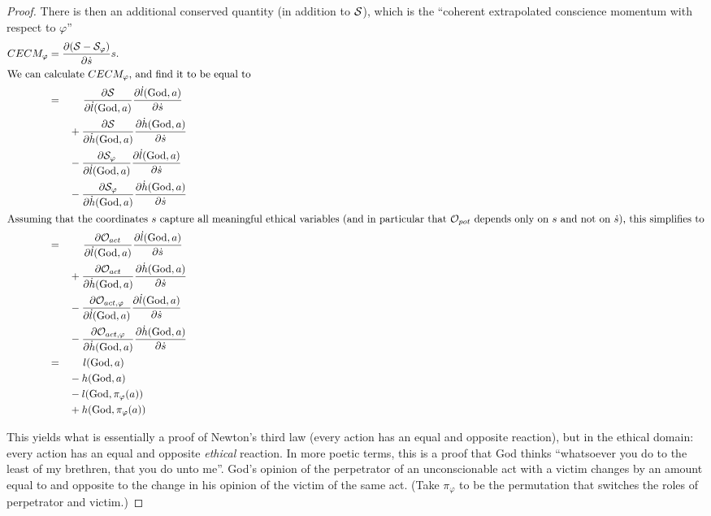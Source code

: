 \documentclass{article}
\begin{document}
\begin{proof}
  There is then an additional conserved quantity (in addition to
  ${\mathcal S}$), which is the ``coherent extrapolated conscience momentum
  with respect to $\varphi$''
  \begin{align*}
CECM_\varphi &= \frac{\partial ({\mathcal S} - {\mathcal S}_\varphi)}{\partial \dot{s}} s. \\
\intertext{We can calculate $CECM_\varphi$, and find it to be equal to}
&= \qquad \frac{\partial {\mathcal S}}{\partial \dot{l}(\mathrm{God}, a)} \frac{\partial \dot{l}(\mathrm{God}, a)}{\partial \dot{s}}\\
&\qquad + \frac{\partial {\mathcal S}}{\partial \dot{h}(\mathrm{God}, a)} \frac{\partial \dot{h}(\mathrm{God}, a)}{\partial \dot{s}}\\
&\qquad - \frac{\partial {\mathcal S}_\varphi}{\partial \dot{l}(\mathrm{God}, a)} \frac{\partial \dot{l}(\mathrm{God}, a)}{\partial \dot{s}}\\
&\qquad - \frac{\partial {\mathcal S}_\varphi}{\partial \dot{h}(\mathrm{God}, a)} \frac{\partial \dot{h}(\mathrm{God}, a)}{\partial \dot{s}}\\
\intertext{Assuming that the coordinates $s$ capture all meaningful
  ethical variables (and in particular that ${\mathcal O}_{pot}$ depends only
  on $s$ and not on $\dot{s}$), this simplifies to}
&= \qquad \frac{\partial {\mathcal O}_{act}}{\partial \dot{l}(\mathrm{God}, a)} \frac{\partial \dot{l}(\mathrm{God}, a)}{\partial \dot{s}}\\
&\qquad + \frac{\partial {\mathcal O}_{act}}{\partial \dot{h}(\mathrm{God}, a)} \frac{\partial \dot{h}(\mathrm{God}, a)}{\partial \dot{s}}\\
&\qquad - \frac{\partial {\mathcal O}_{act, \varphi}}{\partial \dot{l}(\mathrm{God}, a)} \frac{\partial \dot{l}(\mathrm{God}, a)}{\partial \dot{s}}\\
&\qquad - \frac{\partial {\mathcal O}_{act, \varphi}}{\partial \dot{h}(\mathrm{God}, a)} \frac{\partial \dot{h}(\mathrm{God}, a)}{\partial \dot{s}}\\
&= \qquad l(\mathrm{God}, a) \\
&\qquad - h(\mathrm{God}, a) \\
&\qquad - l(\mathrm{God}, \pi_\varphi(a)) \\
&\qquad + h(\mathrm{God}, \pi_\varphi(a)) \\
  \end{align*}

This yields what is essentially a proof of Newton's third law (every
action has an equal and opposite reaction), but in the ethical domain:
every action has an equal and opposite {\em ethical} reaction. In more
poetic terms, this is a proof that God thinks ``whatsoever you do to
the least of my brethren, that you do unto me''. God's opinion of the
perpetrator of an unconscionable act with a victim changes by an
amount equal to and opposite to the change in his opinion of the
victim of the same act. (Take $\pi_\varphi$ to be the permutation that
switches the roles of perpetrator and victim.)
  

\end{proof}
\end{document}
